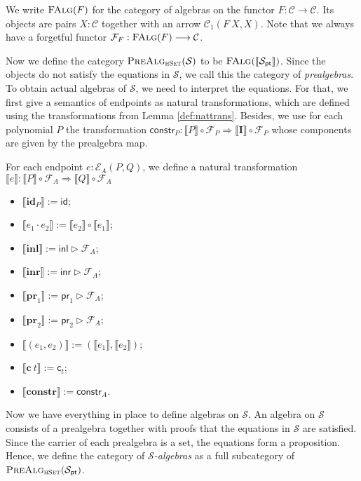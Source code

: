 \documentclass[9pt]{entcs}
\newcommand{\type}[1]{\textsc{#1}}
\newcommand{\constructor}[1]{\mathbf{#1}}
\newcommand{\category}[1]{\textsc{#1}}
\newcommand{\nattranstxt}[1]{\mathsf{#1}}
\newcommand{\hset}{\type{hSet}} %
\newcommand{\0}{\textbf{0}} %
\newcommand{\Def}{:=} %
\newcommand{\functor}[2]{#1 \longrightarrow #2} %
\newcommand{\compf}[2]{#2 \circ #1} %
\newcommand{\nattrans}[2]{#1 \Longrightarrow #2} %
\newcommand{\ctrans}[1]{\nattranstxt{c}_{#1}} %
\newcommand{\constrt}[1]{\nattranstxt{constr}_{#1}} %
\newcommand{\idt}[1]{\nattranstxt{id}} %
\newcommand{\compt}[2]{#2 \circ #1} %
\newcommand{\lwhisker}[2]{#2 \vartriangleright #1} %
\newcommand{\inlt}{\nattranstxt{inl}} %
\newcommand{\inrt}{\nattranstxt{inr}} %
\newcommand{\prlt}{\nattranstxt{pr}_1} %
\newcommand{\prrt}{\nattranstxt{pr}_2} %
\newcommand{\pairt}[2]{(#1 , #2)} %
\newcommand{\falg}[1]{\category{FAlg}(#1)} %
\newcommand{\I}{\constructor{I}} %
\newcommand{\ep}[3]{\mathcal{E}_{#1}(#2,#3)} %
\newcommand{\id}[1]{\constructor{id}_{#1}} %
\newcommand{\comp}[2]{#1 \cdot #2} %
\newcommand{\inle}{\constructor{inl}} %
\newcommand{\inre}{\constructor{inr}} %
\newcommand{\prle}{\constructor{pr}_1} %
\newcommand{\prre}{\constructor{pr}_2} %
\newcommand{\pair}[2]{(#1 , #2)} %
\newcommand{\Ce}{\constructor{c}} %
\newcommand{\constr}{\constructor{constr}} %
\newcommand{\pt}[0]{\textsf{pt}}
\newcommand{\pointc}[1]{#1_{\pt}} %
\newcommand{\sig}{\mathcal{S}} %
\newcommand{\semP}[1]{\llbracket #1 \rrbracket} %
\newcommand{\prealg}[1]{\category{PreAlg}_{\hset}(#1)} %
\newcommand{\forget}[1]{\mathcal{F}_{#1}} %
\newcommand{\semE}[1]{\llbracket #1 \rrbracket} %
\begin{document}
We write $\falg{F}$ for the category of algebras on the functor $F : \functor{\mathcal{C}}{\mathcal{C}}$.
Its objects are pairs $X : \mathcal{C}$ together with an arrow $\mathcal{C}_1(F \> X, X)$.
Note that we always have a forgetful functor $\forget{F} : \functor{\falg{F}}{\mathcal{C}}$.

Now we define the category $\prealg{\sig}$ to be $\falg{\semP{\pointc{\sig}}}$.
Since the objects do not satisfy the equations in $\sig$, we call this the category of \emph{prealgebras}.
To obtain actual algebras of $\sig$, we need to interpret the equations.
For that, we first give a semantics of endpoints as natural transformations, which are defined using the transformations from Lemma \ref{def:nattrans}.
Besides, we use for each polynomial $P$ the transformation $\constrt{P} : \nattrans{\compf{\forget{P}}{\semP{P}}}{\compf{\forget{P}}{\semP{\I}}}$ whose  components are given by the prealgebra map.

\begin{definition}
\label{def:semendpoint}
For each endpoint $e : \ep{A}{P}{Q}$, we define a natural transformation $\semE{e} : \nattrans{\compf{\forget{A}}{\semP{P}}} {\compf{\forget{A}}{\semP{Q}}}$
\begin{itemize}
	\item $\semE{\id{P}} \Def \idt{\compf{\forget{A}}{\semP{P}}}$;
	\item $\semE{\comp{e_1}{e_2}} \Def \compt{\semE{e_1}}{\semE{e_2}}$;
	\item $\semE{\inle} \Def \lwhisker{\forget{A}}{\inlt}$;
	\item $\semE{\inre} \Def \lwhisker{\forget{A}}{\inrt}$;
	\item $\semE{\prle} \Def \lwhisker{\forget{A}}{\prlt}$;
	\item $\semE{\prre} \Def \lwhisker{\forget{A}}{\prrt}$;
	\item $\semE{\pair{e_1}{e_2}} \Def \pairt{\semE{e_1}}{\semE{e_2}}$;
	\item $\semE{\Ce \> t} \Def \ctrans{t}$;
	\item $\semE{\constr} \Def \constrt{A}$.
\end{itemize}
\end{definition}

Now we have everything in place to define algebras on $\sig$.
An algebra on $\sig$ consists of a prealgebra together with proofs that the equations in $\sig$ are satisfied.
Since the carrier of each prealgebra is a set, the equations form a proposition.
Hence, we define the category of \emph{$\sig$-algebras} as a full subcategory of $\prealg{\pointc{\sig}}$.
\end{document}
